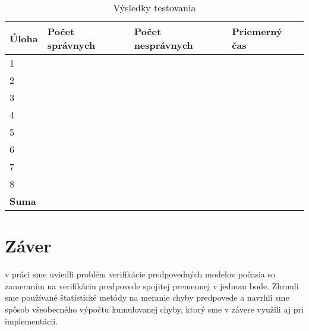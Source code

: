 \begin{table}[h]
\centering
\caption{Výsledky testovania}
\label{table:results}
\begin{tabular}{|l|l|l|l|}
\hline
\textbf{Úloha} & \textbf{Počet správnych} & \textbf{Počet nesprávnych} & \textbf{Priemerný čas} \\ \hline
1              &                          &                            &                                    \\ \hline
2              &                          &                            &                                    \\ \hline
3              &                          &                            &                                    \\ \hline
4              &                          &                            &                                    \\ \hline
5              &                          &                            &                                    \\ \hline
6              &                          &                            &                                    \\ \hline
7              &                          &                            &                                    \\ \hline
8              &                          &                            &                                    \\ \hline
\textbf{Suma}  &                          &                            &                                    \\ \hline
\end{tabular}
\end{table}


\section{Záver}
v práci sme uviedli problém verifikácie predpovedných modelov počasia so zameraním na verifikáciu predpovede spojitej premennej v jednom bode. Zhrnuli sme používané štatistické metódy na meranie chyby predpovede a navrhli sme spôsob všeobecného výpočtu kumulovanej chyby, ktorý sme v závere využili aj pri implementácii.

